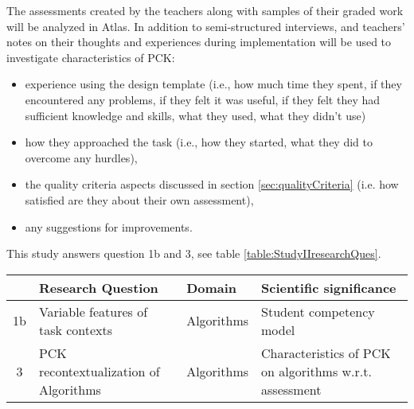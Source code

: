 
The assessments created by the teachers along with samples of their graded work will be analyzed in Atlas. In addition to semi-structured interviews, and teachers' notes on their thoughts and experiences during implementation will be used to investigate characteristics of PCK:
\begin{itemize}
\item experience using the design template (i.e., how much time they spent, if they encountered any problems, if they felt it was useful, if they felt they had sufficient knowledge and skills, what they used, what they didn't use)
\item how they approached the task (i.e., how they started, what they did to overcome any hurdles),
\item the quality criteria aspects discussed in section \ref{sec:qualityCriteria} (i.e. how satisfied are they about their own assessment),
\item any suggestions for improvements.
\end{itemize}





This study answers question 1b and 3, see table \ref{table:StudyIIresearchQues}.
\begin{table*}
  \centering
\begin{tabular}{|c|p{70mm}|l|p{50mm}|}
   \hline
    &\textbf{Research Question} & \textbf{Domain} & \textbf{Scientific significance}\\
  \hline

  1b & Variable features of task contexts& Algorithms & Student competency model \\ \hline
  3 & PCK recontextualization of Algorithms & Algorithms & Characteristics of PCK on algorithms w.r.t. assessment\\
  \hline
\end{tabular}
\caption{Overview study II.}\label{table:StudyIIresearchQues}
\end{table*}



